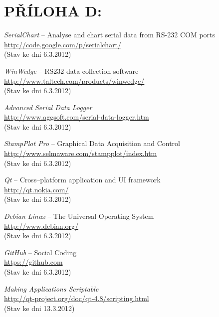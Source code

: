 \documentclass[12pt, a4paper, oneside]{article}
\newcommand{\It}{\textit}  %
\begin{document}
 \section*{PŘÍLOHA D:}
 \begin{thebibliography}{99}

     \It{SerialChart} -- Analyse and chart serial data from RS-232 COM ports \\
    \url{http://code.google.com/p/serialchart/}\\
    (Stav ke dni 6.3.2012)

     \It{WinWedge} -- RS232 data collection software \\
    \url{http://www.taltech.com/products/winwedge/}\\
    (Stav ke dni 6.3.2012)

     \It{Advanced Serial Data Logger} \\
    \url{http://www.aggsoft.com/serial-data-logger.htm}\\
    (Stav ke dni 6.3.2012)

     \It{StampPlot Pro} -- Graphical Data Acquisition and Control \\
    \url{http://www.selmaware.com/stampplot/index.htm}\\
    (Stav ke dni 6.3.2012)

     \It{Qt} -- Cross--platform application and UI framework \\
    \url{http://qt.nokia.com/}\\
    (Stav ke dni 6.3.2012)

     \It{Debian Linux} -- The Universal Operating System \\
    \url{http://www.debian.org/}\\
    (Stav ke dni 6.3.2012)

     \It{GitHub} -- Social Coding \\
    \url{https://github.com}\\
    (Stav ke dni 6.3.2012)

     \It{Making Applications Scriptable} \\
    \url{http://qt-project.org/doc/qt-4.8/scripting.html}\\
    (Stav ke dni 13.3.2012)


\end{thebibliography}
\end{document}
